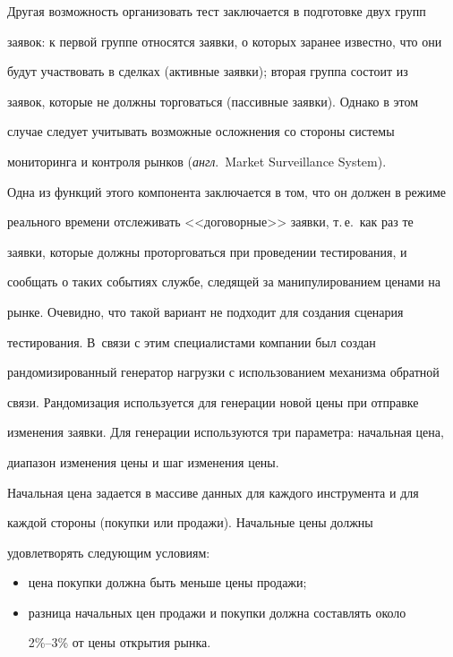   Другая возможность организовать тест заключается в подготовке двух групп


заявок: к первой группе относятся заявки, о которых заранее известно, что они


будут участвовать в сделках (активные заявки); вторая группа состоит из


заявок, которые не должны торговаться (пассивные заявки). Однако в этом


случае следует учитывать возможные осложнения со стороны системы


мониторинга и контроля рынков (\textit{англ}.\ Market Surveillance System).


Одна из функций этого компонента заключается в том, что он должен в режиме


реального времени отслеживать <<договорные>> заявки, т.\,е.\ как раз те


заявки, которые должны проторговаться при проведении тестирования, и


сообщать о таких событиях службе, следящей за манипулированием ценами на


рынке. Очевидно, что такой вариант не подходит для создания сценария


тестирования. В~связи с этим специалистами компании был создан


рандомизированный генератор нагрузки с использованием механизма обратной


связи. Рандомизация используется для генерации новой цены при отправке


изменения заявки. Для генерации используются три параметра: начальная цена,


диапазон изменения цены и шаг изменения цены.





  Начальная цена задается в массиве данных для каждого инструмента и для


каждой стороны (покупки или продажи). Начальные цены должны


удовлетворять сле\-ду\-ющим условиям:


  \begin{itemize}


  \item цена покупки должна быть меньше цены продажи;


  \item разница начальных цен продажи и покупки должна составлять около


  2\%--3\% от цены открытия рынка.


  \end{itemize}






